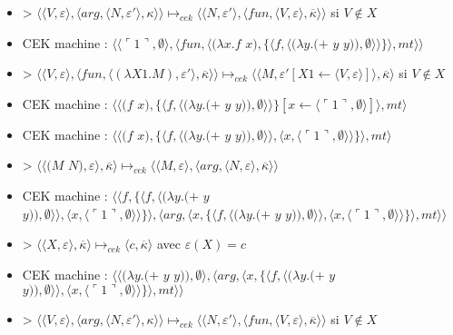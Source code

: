 \documentclass[10pt,a4paper]{article}
\begin{document}
\begin{itemize}
					\item[] >  $\langle \langle V,\varepsilon\rangle,\langle arg,\langle N,\varepsilon'\rangle,\kappa\rangle\rangle \longmapsto_{cek} \langle \langle N,\varepsilon'\rangle,\langle fun,\langle V,\varepsilon\rangle,\overline{\kappa}\rangle\rangle$ si $V \notin X$
					\item[] CEK machine : $\langle\langle\ulcorner 1\urcorner,\emptyset\rangle,\langle fun,\langle(\lambda x.f$ $x),\{\langle f,\langle(\lambda y.(+$ $y$ $y)),\emptyset\rangle\rangle\}\rangle,mt\rangle\rangle$
					\item[] > $\langle\langle V,\varepsilon\rangle,\langle fun,\langle (\lambda X1.M),\varepsilon'\rangle,\overline{\kappa} \rangle \rangle \longmapsto_{cek} \langle \langle M,\varepsilon'[X1 \leftarrow \langle V,\varepsilon\rangle]\rangle,\overline{\kappa}\rangle$ si $V \notin X$
					\item[] CEK machine : $\langle\langle(f$ $x),\{\langle f,\langle(\lambda y.(+$ $y$ $y)),\emptyset\rangle\rangle\}[x \leftarrow \langle\ulcorner 1\urcorner,\emptyset\rangle]\rangle,mt\rangle$
					\item[] CEK machine : $\langle\langle(f$ $x),\{\langle f,\langle(\lambda y.(+$ $y$ $y)),\emptyset\rangle\rangle,\langle x,\langle\ulcorner 1\urcorner,\emptyset\rangle\rangle\}\rangle,mt\rangle$
					\item[] > $\langle\langle(M$ $N),\varepsilon\rangle,\overline{\kappa}\rangle \longmapsto_{cek} \langle \langle M,\varepsilon\rangle,\langle arg,\langle N,\varepsilon\rangle,\overline{\kappa}\rangle\rangle$
					\item[] CEK machine : $\langle\langle f,\{\langle f,\langle(\lambda y.(+$ $y$ $y)),\emptyset\rangle\rangle,\langle x,\langle\ulcorner 1\urcorner,\emptyset\rangle\rangle\}\rangle,\langle arg,\langle x,\{\langle f,\langle(\lambda y.(+$ $y$ $y)),\emptyset\rangle\rangle,\langle x,\langle\ulcorner 1\urcorner,\emptyset\rangle\rangle\}\rangle,mt\rangle\rangle$
					\item[] > $\langle\langle X,\varepsilon\rangle,\overline{\kappa}\rangle \longmapsto_{cek} \langle c,\overline{\kappa}\rangle$ avec $\varepsilon(X) = c$
					\item[] CEK machine : $\langle\langle(\lambda y.(+$ $y$ $y)),\emptyset\rangle,\langle arg,\langle x,\{\langle f,\langle(\lambda y.(+$ $y$ $y)),\emptyset\rangle\rangle,\langle x,\langle\ulcorner 1\urcorner,\emptyset\rangle\rangle\}\rangle,mt\rangle\rangle$
					\item[] > $\langle \langle V,\varepsilon\rangle,\langle arg,\langle N,\varepsilon'\rangle,\kappa\rangle\rangle \longmapsto_{cek} \langle \langle N,\varepsilon'\rangle,\langle fun,\langle V,\varepsilon\rangle,\overline{\kappa}\rangle\rangle$ si $V \notin X$

\end{itemize}
\end{document}
